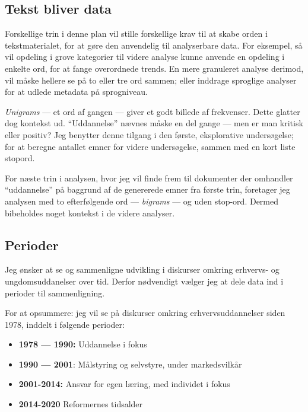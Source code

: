 \subsection{Tekst bliver data}

Forskellige trin i denne plan vil stille forskellige krav til at skabe orden i tekstmaterialet, for at gøre den anvendelig til analyserbare data.
For eksempel, så vil opdeling i grove kategorier til videre analyse kunne anvende en opdeling i enkelte ord, for at fange overordnede trends.
En mere granuleret analyse derimod, vil måske hellere se på to eller tre ord sammen; eller inddrage sproglige analyser for at udlede metadata på sprogniveau.

\textit{Unigrams} — et ord af gangen — giver et godt billede af frekvenser.
Dette glatter dog kontekst ud.
“Uddannelse” nævnes måske en del gange — men er man kritisk eller positiv?
Jeg benytter denne tilgang i den første, eksplorative undersøgelse; for at beregne antallet emner for videre undersøgelse, sammen med en kort liste stopord.

For næste trin i analysen, hvor jeg vil finde frem til dokumenter der omhandler “uddannelse” på baggrund af de genererede emner fra første trin, foretager jeg analysen med to efterfølgende ord — \textit{bigrams} — og uden stop-ord.
Dermed bibeholdes noget kontekst i de videre analyser.


\subsection{Perioder}\label{sec:periods}
Jeg ønsker at se og sammenligne udvikling i diskurser omkring erhvervs- og ungdomsuddanelser over tid.
Derfor nødvendigt vælger jeg at dele data ind i perioder til sammenligning.

For at opsummere: jeg vil se på diskurser omkring erhvervsuddannelser siden 1978, inddelt i følgende perioder:

\begin{itemize}
  \item
    \textbf{1978 — 1990:} Uddannelse i fokus
  \item
    \textbf{1990 — 2001}: Målstyring og selvstyre, under markedsvilkår
  \item
    \textbf{2001-2014:} Ansvar for egen læring, med individet i fokus
  \item
    \textbf{2014-2020} Reformernes tidsalder
\end{itemize}

